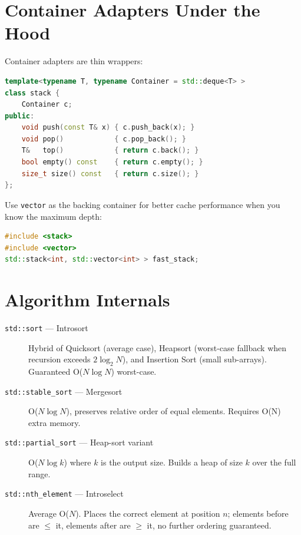 \section{Container Adapters Under the Hood}
\label{sec:adapter-internals}

Container adapters are thin wrappers:

\begin{lstlisting}[language=C++, caption={Approximate stack implementation}]
template<typename T, typename Container = std::deque<T> >
class stack {
    Container c;
public:
    void push(const T& x) { c.push_back(x); }
    void pop()            { c.pop_back(); }
    T&   top()            { return c.back(); }
    bool empty() const    { return c.empty(); }
    size_t size() const   { return c.size(); }
};
\end{lstlisting}

Use \texttt{vector} as the backing container for better cache performance when you know the maximum depth:

\begin{lstlisting}[language=C++, caption={stack backed by vector}]
#include <stack>
#include <vector>
std::stack<int, std::vector<int> > fast_stack;
\end{lstlisting}

\section{Algorithm Internals}
\label{sec:algo-internals}

\begin{description}
    \item[\texttt{std::sort} --- Introsort] Hybrid of Quicksort (average case), Heapsort (worst-case fallback when recursion exceeds $2\log_2 N$), and Insertion Sort (small sub-arrays). Guaranteed O($N\log N$) worst-case.
    \item[\texttt{std::stable\_sort} --- Mergesort] O($N\log N$), preserves relative order of equal elements. Requires O(N) extra memory.
    \item[\texttt{std::partial\_sort} --- Heap-sort variant] O($N\log k$) where $k$ is the output size. Builds a heap of size $k$ over the full range.
    \item[\texttt{std::nth\_element} --- Introselect] Average O($N$). Places the correct element at position $n$; elements before are $\le$ it, elements after are $\ge$ it, no further ordering guaranteed.
\end{description}

